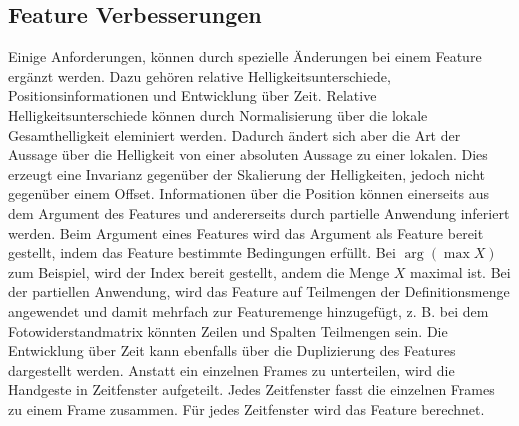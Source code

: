 \subsection{Feature Verbesserungen}
Einige Anforderungen, können durch spezielle Änderungen bei einem Feature ergänzt werden. Dazu gehören relative Helligkeitsunterschiede, Positionsinformationen und Entwicklung über Zeit.
\newline
\newline
Relative Helligkeitsunterschiede können durch Normalisierung über die lokale Gesamthelligkeit eleminiert werden. Dadurch ändert sich aber die Art der Aussage über die Helligkeit von einer absoluten Aussage
zu einer lokalen. Dies erzeugt eine Invarianz gegenüber der Skalierung der Helligkeiten, jedoch nicht gegenüber einem Offset.
\newline
\newline
Informationen über die Position können einerseits aus dem Argument des Features und andererseits durch partielle Anwendung inferiert werden. Beim Argument eines Features wird das Argument als Feature bereit
gestellt, indem das Feature bestimmte Bedingungen erfüllt. Bei $\arg(\max X)$ zum Beispiel, wird der Index bereit gestellt, andem die Menge $X$ maximal ist. Bei der partiellen Anwendung, wird das Feature auf
Teilmengen der Definitionsmenge angewendet und damit mehrfach zur Featuremenge hinzugefügt, z. B. bei dem Fotowiderstandmatrix könnten Zeilen und Spalten Teilmengen sein.
\newline
\newline
Die Entwicklung über Zeit kann ebenfalls über die Duplizierung des Features dargestellt werden. Anstatt ein einzelnen Frames zu unterteilen, wird die Handgeste in Zeitfenster aufgeteilt. Jedes Zeitfenster
fasst die einzelnen Frames zu einem Frame zusammen. Für jedes Zeitfenster wird das Feature berechnet.